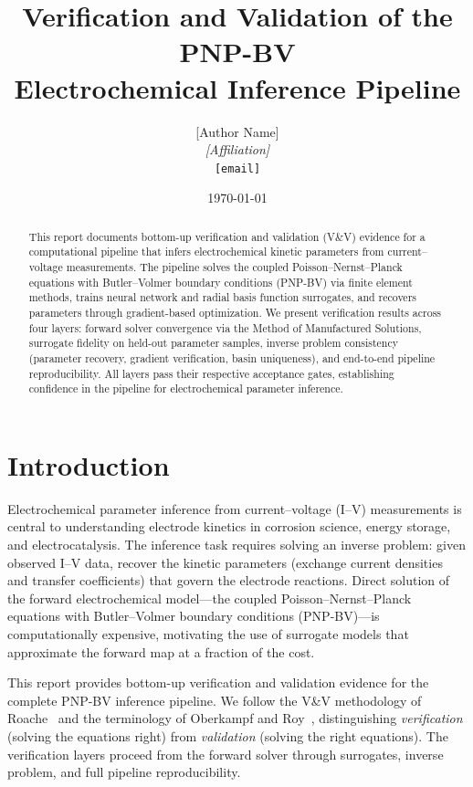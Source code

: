 \documentclass[11pt,a4paper]{article}
\title{Verification and Validation of the PNP-BV\\Electrochemical Inference Pipeline}
\author{[Author Name]\\[0.3em]
\textit{[Affiliation]}\\
\texttt{[email]}}
\date{\today}
\begin{document}
\maketitle

\begin{abstract}
This report documents bottom-up verification and validation (V\&V) evidence
for a computational pipeline that infers electrochemical kinetic parameters
from current--voltage measurements. The pipeline solves the coupled
Poisson--Nernst--Planck equations with Butler--Volmer boundary conditions
(PNP-BV) via finite element methods, trains neural network and radial basis
function surrogates, and recovers parameters through gradient-based
optimization. We present verification results across four layers: forward
solver convergence via the Method of Manufactured Solutions, surrogate
fidelity on held-out parameter samples, inverse problem consistency
(parameter recovery, gradient verification, basin uniqueness), and
end-to-end pipeline reproducibility. All layers pass their respective
acceptance gates, establishing confidence in the pipeline for
electrochemical parameter inference.
\end{abstract}

\section{Introduction}
\label{sec:introduction}

Electrochemical parameter inference from current--voltage (I--V)
measurements is central to understanding electrode kinetics in corrosion
science, energy storage, and electrocatalysis. The inference task requires
solving an inverse problem: given observed I--V data, recover the kinetic
parameters (exchange current densities and transfer coefficients) that
govern the electrode reactions. Direct solution of the forward
electrochemical model---the coupled Poisson--Nernst--Planck equations with
Butler--Volmer boundary conditions (PNP-BV)---is computationally expensive,
motivating the use of surrogate models that approximate the forward map at
a fraction of the cost.

This report provides bottom-up verification and validation evidence for
the complete PNP-BV inference pipeline. We follow the V\&V methodology of
Roache~\cite{roache1998,roache2002} and the terminology of Oberkampf and
Roy~\cite{oberkampf2010}, distinguishing \emph{verification} (solving the
equations right) from \emph{validation} (solving the right equations). The
verification layers proceed from the forward solver through surrogates,
inverse problem, and full pipeline reproducibility.
\end{document}
